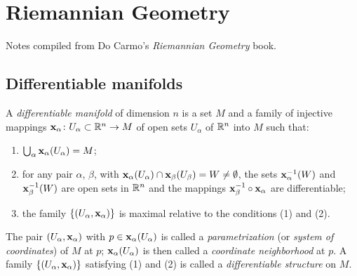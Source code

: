 \chapter{Riemannian Geometry}
Notes compiled from Do Carmo's \emph{Riemannian Geometry} book.
\section{Differentiable manifolds}
\begin{definition}
  A \emph{differentiable manifold} of dimension \(n\) is a set \(M\) and a
  family of injective mappings
  \(\mathbf{x}_\alpha\colon U_\alpha\subset\mathbb{R}^n\to M\) of open sets
  \(U_\alpha\) of \(\mathbb{R}^n\) into \(M\) such that:
  \begin{enumerate}[label=(\arabic*),noitemsep]
  \item \(\bigcup_\alpha\mathbf{x}_\alpha(U_\alpha)=M\);
  \item for any pair \(\alpha\), \(\beta\), with
    \(\mathbf{x}_\alpha(U_\alpha)\cap\mathbf{x}_\beta(U_\beta)=W\neq\emptyset\), the
    sets \(\mathbf{x}_\alpha^{-1}(W)\) and \(\mathbf{x}_\beta^{-1}(W)\) are open sets
    in \(\mathbb{R}^n\) and the mappings \(\mathbf{x}_\beta^{-1}\circ\mathbf{x}_\alpha\) are
    differentiable;
  \item the family \(\{(U_\alpha,\mathbf{x}_\alpha)\}\) is maximal relative to
    the conditions (1) and (2).
  \end{enumerate}
\end{definition}

The pair \((U_\alpha,\mathbf{x}_\alpha)\) with \(p\in\mathbf{x}_\alpha(U_\alpha)\) is
called a \emph{parametrization} (or \emph{system of coordinates}) of \(M\)
at \(p\); \(\mathbf{x}_\alpha(U_\alpha)\) is then called a \emph{coordinate
  neighborhood} at \(p\). A family \(\{(U_\alpha,\mathbf{x}_\alpha)\}\)
satisfying (1) and (2) is called a \emph{differentiable structure} on
\(M\).

